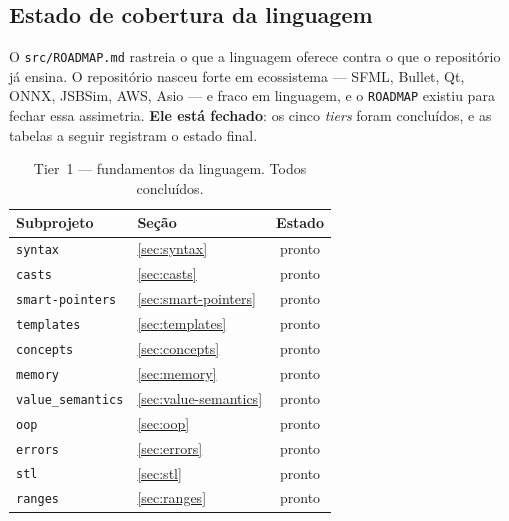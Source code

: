 \subsection{Estado de cobertura da linguagem}
\label{sec:cobertura}

O \texttt{src/ROADMAP.md} rastreia o que a linguagem oferece contra o que o
repositório já ensina. O repositório nasceu forte em ecossistema --- SFML,
Bullet, Qt, ONNX, JSBSim, AWS, Asio --- e fraco em linguagem, e o
\texttt{ROADMAP} existiu para fechar essa assimetria. \textbf{Ele está
fechado}: os cinco \emph{tiers} foram concluídos, e as tabelas a seguir
registram o estado final.

\begin{table}[htbp]
\centering
\caption{Tier~1 --- fundamentos da linguagem. Todos concluídos.}
\label{tab:tier1}
\footnotesize
\begin{tabular}{@{}llc@{}}
\toprule
\textbf{Subprojeto} & \textbf{Seção} & \textbf{Estado} \\
\midrule
\texttt{syntax}          & \ref{sec:syntax}           & pronto \\
\texttt{casts}           & \ref{sec:casts}            & pronto \\
\texttt{smart-pointers}  & \ref{sec:smart-pointers}   & pronto \\
\texttt{templates}       & \ref{sec:templates}        & pronto \\
\texttt{concepts}        & \ref{sec:concepts}         & pronto \\
\texttt{memory}          & \ref{sec:memory}           & pronto \\
\texttt{value\_semantics}& \ref{sec:value-semantics}  & pronto \\
\texttt{oop}             & \ref{sec:oop}              & pronto \\
\texttt{errors}          & \ref{sec:errors}           & pronto \\
\texttt{stl}             & \ref{sec:stl}              & pronto \\
\texttt{ranges}          & \ref{sec:ranges}           & pronto \\
\bottomrule
\end{tabular}
\end{table}

